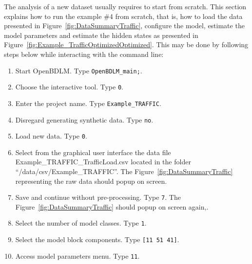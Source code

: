 The analysis of a new dataset usually requires to start from scratch.
This section explains how to run the example \#4 from scratch, that is, how to load the data presented in Figure~\ref{fig:DataSummaryTraffic}, configure the model, estimate the model parameters and estimate the hidden states as presented in Figure~\ref{fig:Example_TrafficOptimizedOptimized}.
This may be done by following steps below while interacting with the \MATLAB{} command line:
\begin{enumerate}
\item Start OpenBDLM. Type \colorbox{light-gray}{\lstinline[basicstyle = \mlttfamily \small, backgroundcolor = \color{light-gray}]!OpenBDLM_main;!}.
\item Choose the interactive tool. Type \colorbox{light-gray}{\lstinline[basicstyle = \mlttfamily \small, backgroundcolor = \color{light-gray}]!0!}.
\item Enter the project name. Type \colorbox{light-gray}{\lstinline[basicstyle = \mlttfamily \small, backgroundcolor = \color{light-gray}]!Example_TRAFFIC!}. 
\item Disregard generating synthetic data. Type \colorbox{light-gray}{\lstinline[basicstyle = \mlttfamily \small, backgroundcolor = \color{light-gray}]!no!}. 
\item Load new data. Type \colorbox{light-gray}{\lstinline[basicstyle = \mlttfamily \small, backgroundcolor = \color{light-gray}]!0!}.
\item Select from the graphical user interface the data file Example\_TRAFFIC\_TrafficLoad.csv located in the folder ``/data/csv/Example\_TRAFFIC''. The Figure~\ref{fig:DataSummaryTraffic} representing the raw data should popup on screen.
\item Save and continue without pre-processing. Type \colorbox{light-gray}{\lstinline[basicstyle = \mlttfamily \small, backgroundcolor = \color{light-gray}]!7!}. The Figure~\ref{fig:DataSummaryTraffic} should popup on screen again,.
\item Select the number of model classes. Type \colorbox{light-gray}{\lstinline[basicstyle = \mlttfamily \small, backgroundcolor = \color{light-gray}]!1!}. 
\item Select the model block components. Type \colorbox{light-gray}{\lstinline[basicstyle = \mlttfamily \small, backgroundcolor = \color{light-gray}]![11 51 41]!}.
\item Access model parameters menu. Type \colorbox{light-gray}{\lstinline[basicstyle = \mlttfamily \small, backgroundcolor = \color{light-gray}]!11!}.

\end{enumerate}
